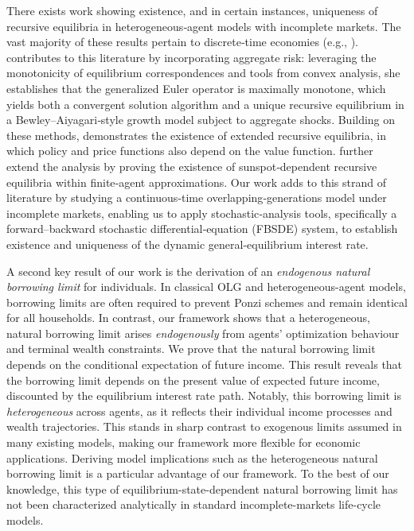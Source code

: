 \documentclass[11pt,oneside,english,reqno,dvipsnames,table]{amsart}
\numberwithin{equation}{section}
\theoremstyle{plain}
\theoremstyle{definition}
\theoremstyle{remark}
\theoremstyle{plain}
\theoremstyle{plain}
\theoremstyle{plain}
\theoremstyle{plain}
\theoremstyle{plain}
\theoremstyle{plain}
\theoremstyle{plain}
\numberwithin{thm}{section}
\begin{document}
There exists work showing existence, and in certain instances,  uniqueness of recursive equilibria in heterogeneous‐agent models with incomplete markets. The vast majority of these results pertain to discrete‐time economies (e.g., \cite{AcemogluJensen2015_JPE}). \cite{Proehl2024} contributes to this literature by incorporating aggregate risk: leveraging the monotonicity of equilibrium correspondences and tools from convex analysis, she establishes that the generalized Euler operator is maximally monotone, which yields both a convergent solution algorithm and a unique recursive equilibrium in a Bewley–Aiyagari‐style growth model subject to aggregate shocks. Building on these methods, \cite{Cao2020_JET} demonstrates the existence of extended recursive equilibria, in which policy and price functions also depend on the value function. \cite{BrummKryczkaKubler2017_Eca} further extend the analysis by proving the existence of sunspot‐dependent recursive equilibria within finite‐agent approximations.   Our work adds to this strand of literature by studying a continuous‐time overlapping‐generations model under incomplete markets, enabling us to apply stochastic‐analysis tools, specifically a forward–backward stochastic differential‐equation (FBSDE) system, to establish existence and uniqueness of the dynamic general‐equilibrium interest rate.

A second key result  of our work is the derivation of an \textit{endogenous natural borrowing limit} for individuals. In classical OLG and heterogeneous-agent models, borrowing limits are often required to prevent Ponzi schemes \cite{aiyagari_94_uninsured} and remain identical for all households. In contrast, our framework shows that a heterogeneous, natural borrowing limit arises \textit{endogenously} from agents' optimization behaviour and terminal wealth constraints. We prove that the natural borrowing limit depends on the conditional expectation of future income. This result reveals that the borrowing limit depends on the present value of expected future income, discounted by the equilibrium interest rate path. Notably, this borrowing limit is \textit{heterogeneous} across agents, as it reflects their individual income processes and wealth trajectories. This stands in sharp contrast to exogenous limits assumed in many existing models, making our framework more flexible for economic applications. Deriving model implications such as the heterogeneous natural borrowing limit is a particular advantage of our framework. 
To the best of our knowledge, this type of equilibrium-state-dependent natural borrowing limit has not been characterized analytically in standard incomplete-markets life-cycle models.
\end{document}
